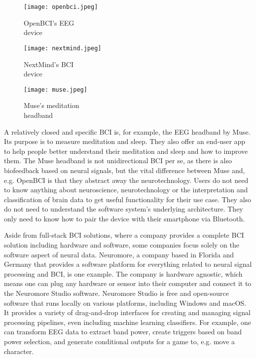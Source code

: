 \begin{figure}[!htb]
  \texttt{[image: openbci.jpeg]}
  \caption{OpenBCI's EEG \\ device \citep{be_superhvman_conor_2017}}
  \label{fig:openbci}
  \endminipage\hfill
  \texttt{[image: nextmind.jpeg]}
  \caption{NextMind's BCI \\ device \citep{louise_neurotechnology_2019}}
  \label{fig:nextmind}
  \endminipage\hfill
  \texttt{[image: muse.jpeg]}
  \caption{Muse's meditation \\ headband \citep{muse_muse_nodate}}
  \label{fig:muse}
  \endminipage
\end{figure}

A relatively closed and specific BCI is, for example, the EEG headband by Muse. Its purpose is to measure meditation and sleep. They also offer an end-user app to help people better understand their meditation and sleep and how to improve them. The Muse headband is not unidirectional BCI per se, as there is also biofeedback based on neural signals, but the vital difference between Muse and, e.g. OpenBCI is that they abstract away the neurotechnology. Users do not need to know anything about neuroscience, neurotechnology or the interpretation and classification of brain data to get useful functionality for their use case. They also do not need to understand the software system's underlying architecture. They only need to know how to pair the device with their smartphone via Bluetooth.

Aside from full-stack BCI solutions, where a company provides a complete BCI solution including hardware and software, some companies focus solely on the software aspect of neural data. Neuromore, a company based in Florida and Germany that provides a software platform for everything related to neural signal processing and BCI, is one example. The company is hardware agnostic, which means one can plug any hardware or sensor into their computer and connect it to the Neuromore Studio software. Neuromore Studio is free and open-source software that runs locally on various platforms, including Windows and macOS. It provides a variety of drag-and-drop interfaces for creating and managing signal processing pipelines, even including machine learning classifiers. For example, one can transform EEG data to extract band power, create triggers based on band power selection, and generate conditional outputs for a game to, e.g. move a character.

